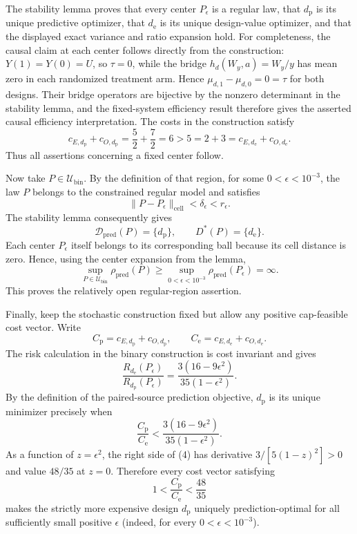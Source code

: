 The stability lemma proves that every center \(P_\epsilon\) is a regular law, that \(d_{\mathrm p}\) is its unique predictive optimizer, that \(d_{\mathrm e}\) is its unique design-value optimizer, and that the displayed exact variance and ratio expansion hold.  For completeness, the causal claim at each center follows directly from the construction: \(Y(1)=Y(0)=U\), so \(\tau=0\), while the bridge \(h_d(W_y,a)=W_y/y\) has mean zero in each randomized treatment arm.  Hence \(\mu_{d,1}-\mu_{d,0}=0=\tau\) for both designs.  Their bridge operators are bijective by the nonzero determinant in the stability lemma, and the fixed-system efficiency result therefore gives the asserted causal efficiency interpretation.  The costs in the construction satisfy
\[
 c_{E,d_{\mathrm p}}+c_{O,d_{\mathrm p}}=\frac52+\frac72=6
 >5=2+3=c_{E,d_{\mathrm e}}+c_{O,d_{\mathrm e}}.
\]
Thus all assertions concerning a fixed center follow.

Now take \(P\in\mathcal U_{\mathrm{bin}}\).  By the definition of that region, for some \(0<\epsilon<10^{-3}\), the law \(P\) belongs to the constrained regular model and satisfies
\[
 \|P-P_\epsilon\|_{\mathrm{cell}}<\delta_\epsilon<r_\epsilon.
\]
The stability lemma consequently gives
\[
 \mathcal D_{\mathrm{pred}}(P)=\{d_{\mathrm p}\},
 \qquad
 D^*(P)=\{d_{\mathrm e}\}. \tag{1}
\]
Each center \(P_\epsilon\) itself belongs to its corresponding ball because its cell distance is zero.  Hence, using the center expansion from the lemma,
\[
 \sup_{P\in\mathcal U_{\mathrm{bin}}}\rho_{\mathrm{pred}}(P)
 \ge \sup_{0<\epsilon<10^{-3}}\rho_{\mathrm{pred}}(P_\epsilon)
 =\infty. \tag{2}
\]
This proves the relatively open regular-region assertion.

Finally, keep the stochastic construction fixed but allow any positive cap-feasible cost vector.  Write
\[
 C_{\mathrm p}=c_{E,d_{\mathrm p}}+c_{O,d_{\mathrm p}},
 \qquad
 C_{\mathrm e}=c_{E,d_{\mathrm e}}+c_{O,d_{\mathrm e}}.
\]
The risk calculation in the binary construction is cost invariant and gives
\[
 \frac{R_{d_{\mathrm e}}(P_\epsilon)}{R_{d_{\mathrm p}}(P_\epsilon)}
 =\frac{3(16-9\epsilon^2)}{35(1-\epsilon^2)}. \tag{3}
\]
By the definition of the paired-source prediction objective, \(d_{\mathrm p}\) is its unique minimizer precisely when
\[
 \frac{C_{\mathrm p}}{C_{\mathrm e}}
 <\frac{3(16-9\epsilon^2)}{35(1-\epsilon^2)}. \tag{4}
\]
As a function of \(z=\epsilon^2\), the right side of (4) has derivative \(3/[5(1-z)^2]>0\) and value \(48/35\) at \(z=0\).  Therefore every cost vector satisfying
\[
 1<\frac{C_{\mathrm p}}{C_{\mathrm e}}<\frac{48}{35} \tag{5}
\]
makes the strictly more expensive design \(d_{\mathrm p}\) uniquely prediction-optimal for all sufficiently small positive \(\epsilon\) (indeed, for every \(0<\epsilon<10^{-3}\)).

